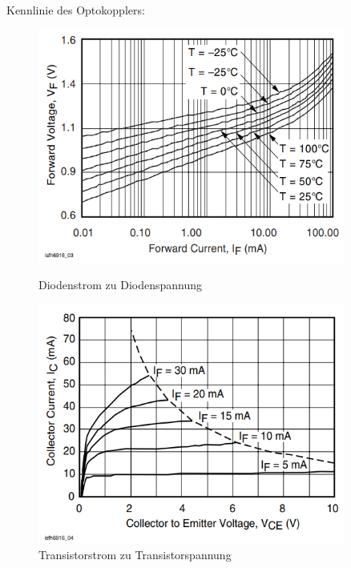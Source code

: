 Kennlinie des Optokopplers:

\begin{figure}[H]
  \begin{minipage}[hbt]{0.45\textwidth}
    \includegraphics[width=0.9\textwidth]{Bilder/Kennlinien/Opto_Vf_If}
 	\caption{Diodenstrom zu Diodenspannung}
  	\label{Opto_Vf_If}
  \end{minipage}
\hspace{.03\linewidth}
  \begin{minipage}[hbt]{0.45\textwidth}
    \includegraphics[width=0.9\textwidth]{Bilder/Kennlinien/Opto_Vce_Ic}
  	\caption{Transistorstrom zu Transistorspannung}
  	\label{Opto_Vce_Ic}
  \end{minipage}
\end{figure}

\newpage
